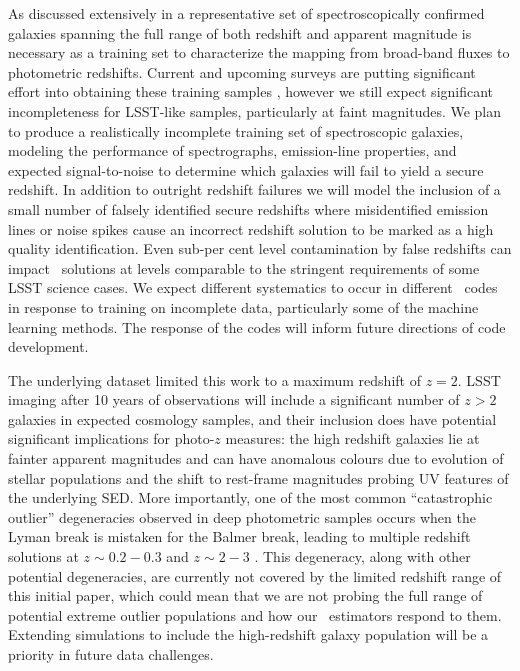 As discussed extensively in \citet{Newman:2015} a representative set of spectroscopically confirmed galaxies spanning the full range of both redshift and apparent magnitude is necessary as a training set to characterize the mapping from broad-band fluxes to photometric redshifts.
Current and upcoming surveys are putting significant effort into obtaining these training samples \citep[e.~g.\,][]{Masters:2017}, however we still expect significant incompleteness for LSST-like samples, particularly at faint magnitudes.
We plan to produce a realistically incomplete training set of spectroscopic galaxies, modeling the performance of spectrographs, emission-line properties, and expected signal-to-noise to determine which galaxies will fail to yield a secure redshift.
In addition to outright redshift failures we will model the inclusion of a small number of falsely identified secure redshifts where misidentified emission lines or noise spikes cause an incorrect redshift solution to be marked as a high quality identification.
Even sub-per cent level contamination by false redshifts can impact \pz\ solutions at levels comparable to the stringent  requirements of some LSST science cases.
We expect different systematics to occur in different \pzpdf\ codes in response to training on incomplete data, particularly some of the machine learning methods.
The response of the codes will inform future directions of code development.

The underlying dataset limited this work to a maximum redshift of $z=2$.
LSST imaging after 10 years of observations will include a significant number of $z>2$ galaxies in expected cosmology samples, and their inclusion does have potential significant implications for photo-$z$ measures: the high redshift galaxies lie at fainter apparent magnitudes and can have anomalous colours due to evolution of stellar populations and the shift to rest-frame magnitudes probing UV features of the underlying SED.
More importantly, one of the most common ``catastrophic outlier'' degeneracies observed in deep photometric samples occurs when the Lyman break is mistaken for the Balmer break, leading to multiple redshift solutions at $z\sim0.2-0.3$ and $z\sim2-3$ \citep{Massarotti:2001}.
This degeneracy, along with other potential degeneracies, are currently not covered by the limited redshift range of this initial paper, which could mean that we are not probing the full range of potential extreme outlier populations and how our \pz\ estimators respond to them.
Extending simulations to include the high-redshift galaxy population will be a priority in future data challenges.

